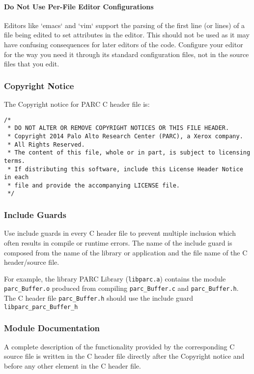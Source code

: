 \documentclass[fleqn,12pt]{PARCOneColumn} %
\begin{document}
\paragraph{Do Not Use Per-File Editor Configurations}
Editors like `emacs` and `vim` support the parsing of the first line (or lines) of
a file being edited to set attributes in the editor.
This should not be used as it may have confusing consequences for later editors of the code.
Configure your editor for the way you need it through its standard configuration files,
not in the source files that you edit.

\subsubsection{Copyright Notice}
The Copyright notice for PARC C header file is:

\begin{lstlisting}[caption=A Canonical Copyright Notice]
/*
 * DO NOT ALTER OR REMOVE COPYRIGHT NOTICES OR THIS FILE HEADER.
 * Copyright 2014 Palo Alto Research Center (PARC), a Xerox company.
 * All Rights Reserved.
 * The content of this file, whole or in part, is subject to licensing terms.
 * If distributing this software, include this License Header Notice in each
 * file and provide the accompanying LICENSE file.
 */
\end{lstlisting}

\subsubsection{Include Guards}
Use include guards in every C header file to prevent multiple inclusion which often results in compile or runtime errors. The name of the include guard is composed from the name of the library or application and the file name of the C header/source file.

For example, the library PARC Library ({\tt libparc.a}) contains the module {\tt parc\_Buffer.o} produced from compiling {\tt parc\_Buffer.c} and {\tt parc\_Buffer.h}. 
The C header file {\tt parc\_Buffer.h} should use the include guard {\tt libparc\_parc\_Buffer\_h}

\subsubsection{Module Documentation}
A complete description of the functionality provided by the corresponding C source file is written in the C header file directly after the Copyright notice and before any other element in the C header file.
\end{document}
